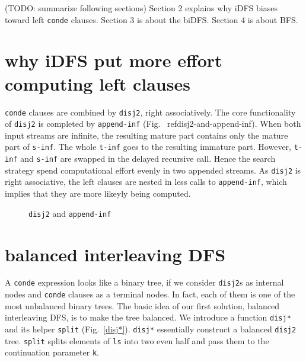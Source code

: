 \documentclass[format=acmlarge, review=true, authordraft=true]{acmart}
\begin{document}


(TODO: summarize following sections) Section 2 explains why iDFS biases toward left \texttt{conde} clauses. Section 3 is about the biDFS. Section 4 is about BFS.

\section{why iDFS put more effort computing left clauses}

\texttt{conde} clauses are combined by \texttt{disj2}, right associatively. The
core functionality of \texttt{disj2} is completed by \texttt{append-inf} (Fig.~
ref{disj2-and-append-inf}). When both input streams are infinite, the resulting
mature part contains only the mature part of \texttt{s-inf}. The whole
\texttt{t-inf} goes to the resulting immature part. However, \texttt{t-inf} and
\texttt{s-inf} are swapped in the delayed recursive call. Hence the search
strategy spend computational effort evenly in two appended streams. As
\texttt{disj2} is right associative, the left clauses are nested in less calls
to \texttt{append-inf}, which implies that they are more likeyly being
computed.

\begin{figure}
  
  \caption{\texttt{disj2} and \texttt{append-inf}}
  \label{disj2-and-append-inf}
\end{figure}
 
\section{balanced interleaving DFS}

A \texttt{conde} expression looks like a binary tree, if we consider 
\texttt{disj2}s as internal nodes and \texttt{conde} clauses as a terminal 
nodes. In fact, each of them is one of the most unbalanced binary trees. The 
basic idea of our first solution, balanced interleaving DFS, is to make the 
tree balanced. We introduce a function \texttt{disj*} and its helper 
\texttt{split} (Fig.~\ref{disj*}). \texttt{disj*} essentially construct a 
balanced \texttt{disj2} tree. \texttt{split} splits elements of \texttt{ls} 
into two even half and pass them to the continuation parameter \texttt{k}.
\end{document}
